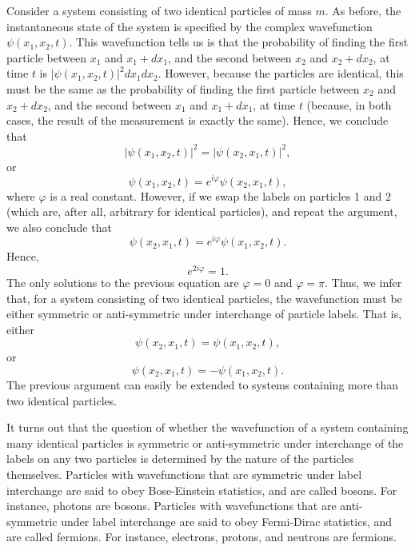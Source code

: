 Consider a system consisting of two identical particles of mass $m$. As before, the instantaneous state of the system is specified by the complex wavefunction $\psi(x_{1}, x_{2}, t)$. This wavefunction tells us is that the probability of finding the first particle between $x_{1}$ and $x_{1}+dx_{1}$, and the second between $x_{2}$ and $x_{2}+dx_{2}$, at time $t$ is $|\psi(x_{1}, x_{2}, t)|^{2} dx_{1} dx_{2}$. However, because the particles are identical, this must be the same as the probability of finding the first particle between $x_{2}$ and $x_{2}+dx_{2}$, and the second between $x_{1}$ and $x_{1}+dx_{1}$, at time $t$ (because, in both cases, the result of the measurement is exactly the same). Hence, we conclude that
\begin{equation}
	|\psi(x_1, x_2, t)|^2 = |\psi(x_2, x_1, t)|^2,
	\label{eq:5.4.1}
\end{equation}
or
\begin{equation}
	\psi(x_1, x_2, t) = e^{i\varphi}\psi(x_2, x_1, t),
	\label{eq:5.4.2}
\end{equation}
where $\varphi$ is a real constant. However, if we swap the labels on particles 1 and 2 (which are, after all, arbitrary for identical particles), and repeat the argument, we also conclude that
\begin{equation}
	\psi(x_2, x_1, t) = e^{i\varphi}\psi(x_1, x_2, t).
	\label{eq:5.4.3}
\end{equation}
Hence,
\begin{equation}
	e^{2i\varphi} = 1.
	\label{eq:5.4.4}
\end{equation}
The only solutions to the previous equation are $\varphi = 0$ and $\varphi = \pi$. Thus, we infer that, for a system consisting of two identical particles, the wavefunction must be either symmetric or anti-symmetric under interchange of particle labels. That is, either
\begin{equation}
	\psi(x_2, x_1, t) = \psi(x_1, x_2, t),
	\label{eq:5.4.5}
\end{equation}
or
\begin{equation}
	\psi(x_2, x_1, t) = -\psi(x_1, x_2, t).
	\label{eq:5.4.6}
\end{equation}
The previous argument can easily be extended to systems containing more than two identical particles.

It turns out that the question of whether the wavefunction of a system containing many identical particles is symmetric or anti-symmetric under interchange of the labels on any two particles is determined by the nature of the particles themselves. Particles with wavefunctions that are symmetric under label interchange are said to obey Bose-Einstein statistics, and are called bosons. For instance, photons are bosons. Particles with wavefunctions that are anti-symmetric under label interchange are said to obey Fermi-Dirac statistics, and are called fermions. For instance, electrons, protons, and neutrons are fermions.

